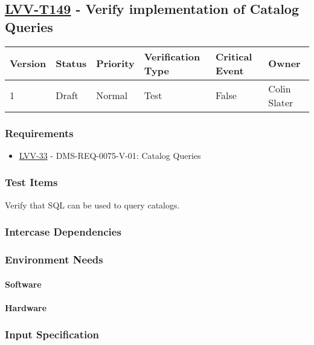 \subsection{\href{https://jira.lsstcorp.org/secure/Tests.jspa\#/testCase/LVV-T149}{LVV-T149}
    - Verify implementation of Catalog Queries}\label{lvv-t149}

\begin{longtable}[]{llllll}
\toprule
Version & Status & Priority & Verification Type & Critical Event & Owner
\\\midrule
1 & Draft & Normal &
Test & False & Colin Slater
\\\bottomrule
\end{longtable}

\subsubsection{Requirements}
\begin{itemize}
\item \href{https://jira.lsstcorp.org/browse/LVV-33}{LVV-33} - DMS-REQ-0075-V-01: Catalog Queries
\end{itemize}

\subsubsection{Test Items}
Verify that SQL can be used to query catalogs.



\subsubsection{Intercase Dependencies}

\subsubsection{Environment Needs}

\paragraph{Software}

\paragraph{Hardware}

\subsubsection{Input Specification}

